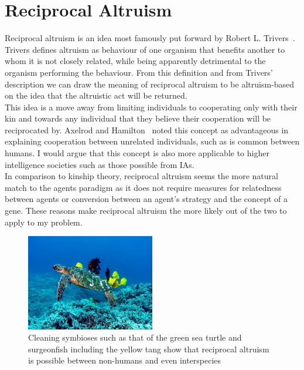 \documentclass[]{final_report}
\begin{document}
\section{Reciprocal Altruism}
Reciprocal altruism is an idea most famously put forward by Robert L. Trivers~\cite{trivers1971evolution}. Trivers defines altruism as behaviour of one organism that benefits another to whom it is not closely related, while being apparently detrimental to the organism performing the behaviour. From this definition and from Trivers' description we can draw the meaning of reciprocal altruism to be altruism-based on the idea that the altruistic act will be returned.\\
This idea is a move away from limiting individuals to cooperating only with their kin and towards any individual that they believe their cooperation will be reciprocated by. Axelrod and Hamilton~\cite{evolution_of_cooperation} noted this concept as advantageous in explaining cooperation between unrelated individuals, such as is common between humans. I would argue that this concept is also more applicable to higher intelligence societies such as those possible from IAs.\\
In comparison to kinship theory, reciprocal altruism seems the more natural match to the agents paradigm as it does not require measures for relatedness between agents or conversion between an agent's strategy and the concept of a gene. These reasons make reciprocal altruism the more likely out of the two to apply to my problem.
\begin{figure}
	\center
	\includegraphics[width=0.5\textwidth]{Green_Sea_Turtle_Cleaning_Station.jpg}
	\caption{Cleaning symbioses such as that of the green sea turtle and surgeonfish including the yellow tang show that reciprocal altruism is possible between non-humans and even interspecies~\cite{turtle}}
	\label{fig:cleaning}
\end{figure}
\end{document}
